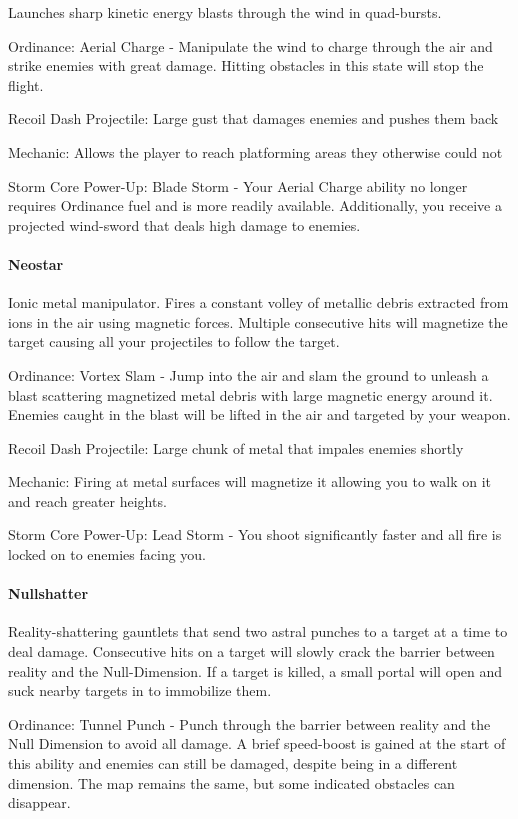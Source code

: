 \documentclass[../Main.tex]{subfiles}
\begin{document}
Launches sharp kinetic energy blasts through the wind in quad-bursts.

Ordinance: Aerial Charge - Manipulate the wind to charge through the air and strike enemies with great damage. Hitting obstacles in this state will stop the flight. 

Recoil Dash Projectile: Large gust that damages enemies and pushes them back

Mechanic: Allows the player to reach platforming areas they otherwise could not

Storm Core Power-Up: Blade Storm - Your Aerial Charge ability no longer requires Ordinance fuel and is more readily available. Additionally, you receive a projected wind-sword that deals high damage to enemies. 

\paragraph{Neostar}

Ionic metal manipulator. Fires a constant volley of metallic debris extracted from ions in the air using magnetic forces. Multiple consecutive hits will magnetize the target causing all your projectiles to follow the target.

Ordinance: Vortex Slam - Jump into the air and slam the ground to unleash a blast scattering magnetized metal debris with large magnetic energy around it. Enemies caught in the blast will be lifted in the air and targeted by your weapon.

Recoil Dash Projectile: Large chunk of metal that impales enemies shortly

Mechanic: Firing at metal surfaces will magnetize it allowing you to walk on it and reach greater heights. 

Storm Core Power-Up: Lead Storm - You shoot significantly faster and all fire is locked on to enemies facing you. 

\paragraph{Nullshatter}

Reality-shattering gauntlets that send two astral punches to a target at a time to deal damage. Consecutive hits on a target will slowly crack the barrier between reality and the Null-Dimension. If a target is killed, a small portal will open and suck nearby targets in to immobilize them.

Ordinance: Tunnel Punch - Punch through the barrier between reality and the Null Dimension to avoid all damage. A brief speed-boost is gained at the start of this ability and enemies can still be damaged, despite being in a different dimension. The map remains the same, but some indicated obstacles can disappear.
\end{document}

